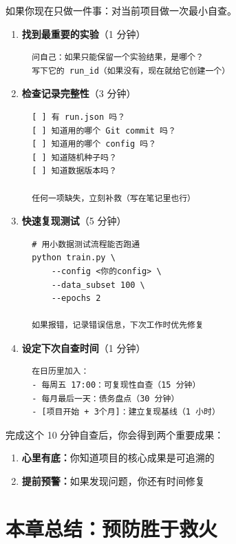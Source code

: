 如果你现在只做一件事：对当前项目做一次最小自查。

\begin{enumerate}
  \item \textbf{找到最重要的实验}（1 分钟）

  \begin{verbatim}
  问自己：如果只能保留一个实验结果，是哪个？
  写下它的 run_id（如果没有，现在就给它创建一个）
  \end{verbatim}

  \item \textbf{检查记录完整性}（3 分钟）

  \begin{verbatim}
  [ ] 有 run.json 吗？
  [ ] 知道用的哪个 Git commit 吗？
  [ ] 知道用的哪个 config 吗？
  [ ] 知道随机种子吗？
  [ ] 知道数据版本吗？

  任何一项缺失，立刻补救（写在笔记里也行）
  \end{verbatim}

  \item \textbf{快速复现测试}（5 分钟）

  \begin{verbatim}
  # 用小数据测试流程能否跑通
  python train.py \
      --config <你的config> \
      --data_subset 100 \
      --epochs 2

  如果报错，记录错误信息，下次工作时优先修复
  \end{verbatim}

  \item \textbf{设定下次自查时间}（1 分钟）

  \begin{verbatim}
  在日历里加入：
  - 每周五 17:00：可复现性自查（15 分钟）
  - 每月最后一天：债务盘点（30 分钟）
  - [项目开始 + 3个月]：建立复现基线（1 小时）
  \end{verbatim}
\end{enumerate}

完成这个 10 分钟自查后，你会得到两个重要成果：
\begin{enumerate}
  \item \textbf{心里有底：}你知道项目的核心成果是可追溯的
  \item \textbf{提前预警：}如果发现问题，你还有时间修复
\end{enumerate}

\section{本章总结：预防胜于救火}

